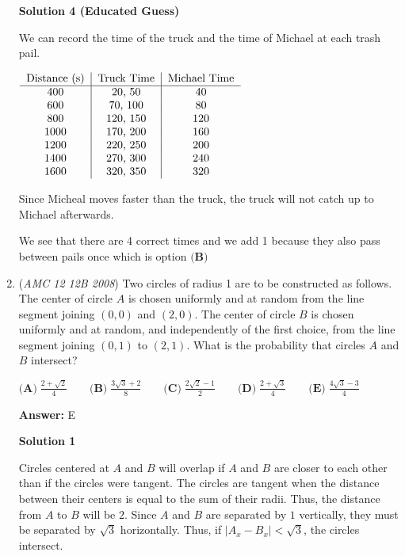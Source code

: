 \begin{enumerate}
 


 



\textbf{Solution 4 (Educated Guess)}

We can record the time of the truck and the time of Michael at each trash pail. 

 $\begin{tabular}{c|c|c}Distance (s) &Truck Time&Michael Time\\ \hline 400&20, 50&40\\ 600&70, 100&80\\ 800&120, 150&120\\ 1000&170, 200&160\\ 1200&220, 250&200\\ 1400&270, 300&240\\ 1600&320, 350&320\\ \end{tabular}$

 Since Micheal moves faster than the truck, the truck will not catch up to Michael afterwards.

 We see that there are 4 correct times and we add 1 because they also pass between pails once which is option $\boxed{\textbf{(B)}}$



	\item (\textit{AMC 12 12B 2008}) Two circles of radius 1 are to be constructed as follows. The center of circle $A$ is chosen uniformly and at random from the line segment joining $(0,0)$ and $(2,0)$. The center of circle $B$ is chosen uniformly and at random, and independently of the first choice, from the line segment joining $(0,1)$ to $(2,1)$. What is the probability that circles $A$ and $B$ intersect?


 $\textbf{(A)} \; \frac {2 + \sqrt {2}}{4} \qquad \textbf{(B)} \; \frac {3\sqrt {3} + 2}{8} \qquad \textbf{(C)} \; \frac {2 \sqrt {2} - 1}{2} \qquad \textbf{(D)} \; \frac {2 + \sqrt {3}}{4} \qquad \textbf{(E)} \; \frac {4 \sqrt {3} - 3}{4}$

 \textbf{Answer: }E



\textbf{Solution 1}

Circles centered at $A$ and $B$ will overlap if $A$ and $B$ are closer to each other than if the circles were tangent. The circles are tangent when the distance between their centers is equal to the sum of their radii. Thus, the distance from $A$ to $B$ will be $2$. Since $A$ and $B$ are separated by $1$ vertically, they must be separated by $\sqrt{3}$ horizontally. Thus, if $|A_x-B_x|<\sqrt{3}$, the circles intersect.


\end{enumerate}
